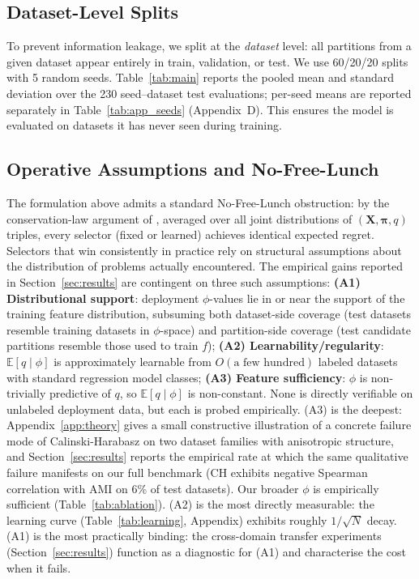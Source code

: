 \documentclass[10pt]{article} %
\begin{document}
\subsection{Dataset-Level Splits}
\label{sec:splits}

To prevent information leakage, we split at the \emph{dataset} level: all partitions from a given dataset appear entirely in train, validation, or test. We use 60/20/20 splits with 5 random seeds. Table~\ref{tab:main} reports the pooled mean and standard deviation over the 230 seed--dataset test evaluations; per-seed means are reported separately in Table~\ref{tab:app_seeds} (Appendix~D). This ensures the model is evaluated on datasets it has never seen during training.

\subsection{Operative Assumptions and No-Free-Lunch}
\label{sec:assumptions}

The formulation above admits a standard No-Free-Lunch obstruction: by the conservation-law argument of \citet{wolpert1996lack}, averaged over all joint distributions of $(\mathbf{X}, \boldsymbol{\pi}, q)$ triples, every selector (fixed or learned) achieves identical expected regret. Selectors that win consistently in practice rely on structural assumptions about the distribution of problems actually encountered. The empirical gains reported in Section~\ref{sec:results} are contingent on three such assumptions: \textbf{(A1) Distributional support}: deployment $\phi$-values lie in or near the support of the training feature distribution, subsuming both dataset-side coverage (test datasets resemble training datasets in $\phi$-space) and partition-side coverage (test candidate partitions resemble those used to train $f$); \textbf{(A2) Learnability/regularity}: $\mathbb{E}[q \mid \phi]$ is approximately learnable from $O(\text{a few hundred})$ labeled datasets with standard regression model classes; \textbf{(A3) Feature sufficiency}: $\phi$ is non-trivially predictive of $q$, so $\mathbb{E}[q \mid \phi]$ is non-constant. None is directly verifiable on unlabeled deployment data, but each is probed empirically. (A3) is the deepest: Appendix~\ref{app:theory} gives a small constructive illustration of a concrete failure mode of Calinski-Harabasz on two dataset families with anisotropic structure, and Section~\ref{sec:results} reports the empirical rate at which the same qualitative failure manifests on our full benchmark (CH exhibits negative Spearman correlation with AMI on 6\% of test datasets). Our broader $\phi$ is empirically sufficient (Table~\ref{tab:ablation}). (A2) is the most directly measurable: the learning curve (Table~\ref{tab:learning}, Appendix) exhibits roughly $1/\sqrt{N}$ decay. (A1) is the most practically binding: the cross-domain transfer experiments (Section~\ref{sec:results}) function as a diagnostic for (A1) and characterise the cost when it fails.
\end{document}
